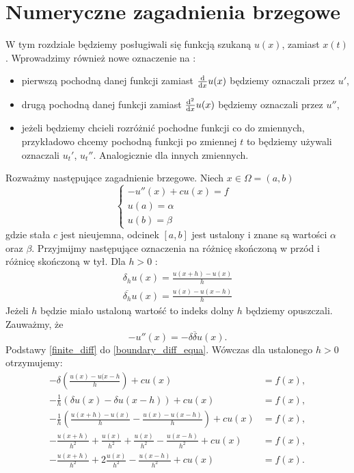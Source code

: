 \documentclass[12pt,a4paper]{report}
\begin{document}
\chapter{Numeryczne zagadnienia brzegowe}
W tym rozdziale będziemy posługiwali się funkcją szukaną $u(x)$, zamiast $x(t)$. Wprowadzimy również nowe oznaczenie na :
\begin{itemize}
\item pierwszą pochodną danej funkcji zamiast $\ddx{x} u(x) $ będziemy oznaczali przez $u'$,
\item drugą pochodną danej funkcji zamiast $\ddx[^2]{x} u(x)$ będziemy oznaczali przez $u''$,
\item jeżeli będziemy chcieli rozróżnić pochodne funkcji co do zmiennych, przykładowo chcemy pochodną funkcji po zmiennej $t$ to będziemy używali oznaczali $u_t'$, $u_t''$. Analogicznie dla innych zmiennych.
\end{itemize}
Rozważmy następujące zagadnienie brzegowe. Niech $ x \in \Omega = (a,b) $
\begin{equation} \label{boundary_diff_equa}
\left\{ \begin{array}{ll}
-u''(x) + cu(x) =f & \\
u(a) = \alpha & \\
u(b) = \beta & 
\end{array} \right.
\end{equation}
gdzie stała $c$ jest nieujemna, odcinek $ [a,b]$ jest ustalony i znane są wartości $\alpha$ oraz $\beta$. Przyjmijmy następujące oznaczenia na różnicę skończoną w przód i różnicę skończoną w tył. Dla $h>0$ :
\begin{equation} \label{finite_diff}
\begin{array}{c}
\delta_h u(x) = \frac{u(x+h) - u(x)}{h}   \\
\overline{\delta_h} u(x) = \frac{u(x)-u(x-h)}{h}  
\end{array}
\end{equation}
Jeżeli $h$ będzie miało ustaloną wartość to indeks dolny $h$ będziemy opuszczali. Zauważmy, że 
$$
-u''(x) = -\delta \overline{\delta} u(x).
$$
Podstawy \ref{finite_diff} do \ref{boundary_diff_equa}. Wówczas dla ustalonego $h>0$ otrzymujemy: 
\begin{equation}
\begin{array}{rl}
-\delta (\frac{u(x)-u(x-h}{h}) + cu(x) &= f(x),  \\
- \frac{1}{h} (\delta u(x) - \delta u(x-h) ) + cu(x) &= f(x), \\
-\frac{1}{h} (\frac{u(x+h)-u(x)}{h} - \frac{u(x)-u(x-h)}{h}) + cu(x) &= f(x), \\
-\frac{u(x+h)}{h^2} + \frac{u(x)}{h^2} + \frac{u(x)}{h^2} - \frac{u(x-h)}{h^2} +cu(x)& = f(x), \\
-\frac{u(x+h)}{h^2} + 2\frac{u(x)}{h^2} - \frac{u(x-h)}{h^2} +cu(x) &= f(x) .
\end{array}
\end{equation}
\end{document}
